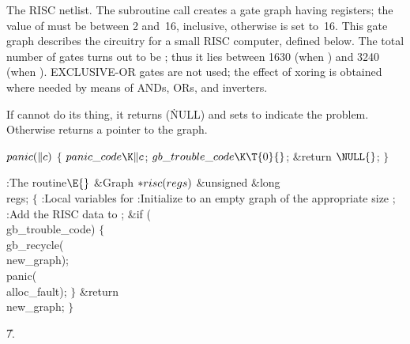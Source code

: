 The RISC netlist. The subroutine call  creates a
gate graph having  registers; the value of  must be
between 2 and~16, inclusive, otherwise  is set to~16.
This gate graph describes the circuitry for a small RISC computer, defined
below. The total number of gates turns out to be ;
thus it lies between 1630 (when ) and 3240 (when ).
{\sc EXCLUSIVE-OR} gates are not used; the effect of xoring is obtained where
needed by means of {\sc AND}s, {\sc OR}s, and inverters.

If  cannot do its thing, it returns \PB{$\NULL$} (\.{NULL})
and sets 
to indicate the problem. Otherwise  returns a pointer to the
graph.

\Y\B\4\D$\\{panic}(\|c)$ \5
${}\{{}$\5
\1${}\\{panic\_code}\K\|c{}$;\5
${}\\{gb\_trouble\_code}\K\T{0}{}$;\5
\&{return} ${}\NULL{}$;\5
${}\}{}$\2\par
\Y\B\4:The  routine\X${}\E{}$\6
\1\1\&{Graph} ${}{*}\\{risc}(\\{regs}){}$\6
\&{unsigned} \&{long} \\{regs};\2\2\6
${}\{{}$\5
\1:Local variables for \X\7
:Initialize  to an empty graph of the appropriate size%
\X;\6
:Add the RISC data to \X;\6
\&{if} (\\{gb\_trouble\_code})\5
${}\{{}$\1\6
\\{gb\_recycle}(\\{new\_graph});\6
\\{panic}(\\{alloc\_fault});\6
\4${}\}{}$\2\6
\&{return} \\{new\_graph};\6
\4${}\}{}$\2\par
\U7.\fi

